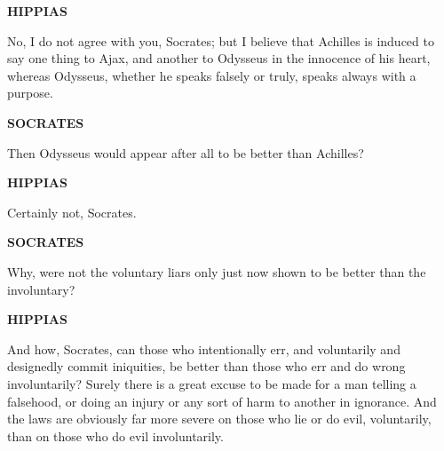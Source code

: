 \documentclass[11pt,letter]{article}
\begin{document}
\par \textbf{HIPPIAS}
\par   No, I do not agree with you, Socrates; but I believe that Achilles is induced to say one thing to Ajax, and another to Odysseus in the innocence of his heart, whereas Odysseus, whether he speaks falsely or truly, speaks always with a purpose.

\par \textbf{SOCRATES}
\par   Then Odysseus would appear after all to be better than Achilles?

\par \textbf{HIPPIAS}
\par   Certainly not, Socrates.

\par \textbf{SOCRATES}
\par   Why, were not the voluntary liars only just now shown to be better than the involuntary?

\par \textbf{HIPPIAS}
\par   And how, Socrates, can those who intentionally err, and voluntarily and designedly commit iniquities, be better than those who err and do wrong involuntarily? Surely there is a great excuse to be made for a man telling a falsehood, or doing an injury or any sort of harm to another in ignorance. And the laws are obviously far more severe on those who lie or do evil, voluntarily, than on those who do evil involuntarily.
\end{document}
